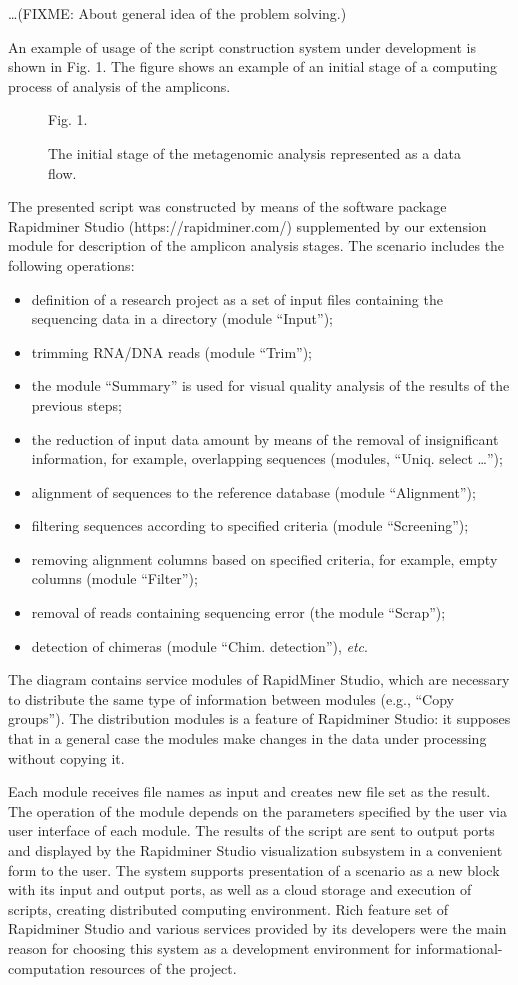 \documentclass[conference,a4paper]{IEEEtran}
\begin{document}
\ldots (FIXME: About general idea of the problem solving.)

An example of usage of the script construction system under development is shown in Fig. 1. The figure shows an example of an initial stage of a computing process of analysis of the amplicons.

\begin{figure}[t]\centering

Fig. 1.  \caption{The initial stage of the metagenomic analysis represented as a data flow.}
\end{figure}

The presented script was constructed by means of the software package Rapidminer Studio (https://rapidminer.com/) supplemented by our extension module for description of the amplicon analysis stages. The scenario includes the following operations:
\begin{itemize}
\item definition of a research project as a set of input files
  containing the sequencing data in a directory (module “Input”);
\item trimming RNA/DNA reads (module “Trim”);
\item the module “Summary” is used for
  visual quality analysis of the results of the previous steps;
\item the reduction of input data amount by means of the removal of insignificant information, for example, overlapping sequences (modules,
  “Uniq. select …”);
\item alignment of sequences to the reference
  database (module “Alignment”);
\item filtering sequences according to
  specified criteria (module “Screening”);
\item removing alignment
  columns based on specified criteria, for example, empty columns
  (module “Filter”);
\item removal of reads containing sequencing
  error (the module “Scrap”);
\item detection of chimeras (module ``Chim. detection''), \emph{etc}.
  \end{itemize}
  The diagram contains service modules of RapidMiner Studio, which are necessary to distribute the same type of information between modules (e.g., “Copy groups”). The distribution modules is a feature of Rapidminer Studio: it supposes that in a general case the modules make changes in the data under processing without copying it.

Each module receives file names as input and creates new file set as the result. The operation of the module depends on the parameters specified by the user via user interface of each module. The results of the script are sent to output ports and displayed by the Rapidminer Studio visualization subsystem in a convenient form to the user.  The system supports presentation of a scenario as a new block with its input and output ports, as well as a cloud storage and execution of scripts, creating distributed computing environment.  Rich feature set of Rapidminer Studio and various services provided by its developers were the main reason for choosing this system as a development environment for informational-computation resources of the project.
\end{document}
